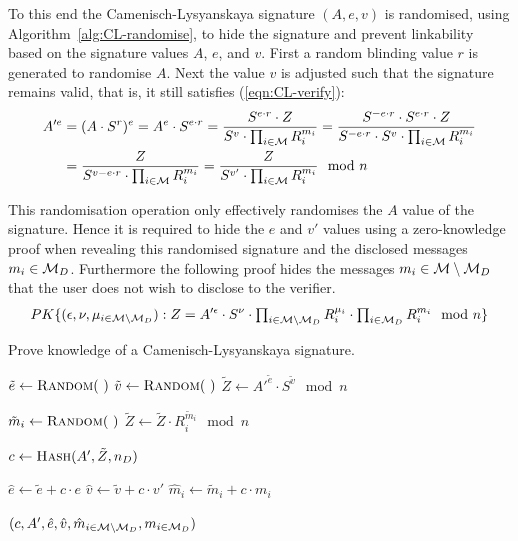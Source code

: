 To this end the Camenisch-Lysyanskaya signature $(A, e, v)$ is randomised, using
Algorithm~\ref{alg:CL-randomise}, to hide the signature and prevent linkability
based on the signature values $A$, $e$, and $v$. First a random blinding value
$r$ is generated to randomise $A$. Next the value $v$ is adjusted such that the
signature remains valid, that is, it still satisfies (\ref{eqn:CL-verify}):
\begin{align*}
  A'^e
  & = (A \cdot S^r)^e
  = A^e \cdot S^{e \cdot r}
  = \dfrac{S^{e \cdot r} \cdot Z}{S^v \cdot \prod_{i \in \mathcal{M}} R_i^{m_i}}
  = \dfrac{S^{- e \cdot r} \cdot S^{e \cdot r} \cdot Z}{S^{- e \cdot r} \cdot S^v \cdot \prod_{i \in \mathcal{M}} R_i^{m_i}} \\
  & = \dfrac{Z}{S^{v - e \cdot r} \cdot \prod_{i \in \mathcal{M}} R_i^{m_i}}
  = \dfrac{Z}{S^{v'} \cdot \prod_{i \in \mathcal{M}} R_i^{m_i}} \mod n
\end{align*}

This randomisation operation only effectively randomises the $A$ value of the
signature. Hence it is required to hide the $e$ and $v'$ values using a
zero-knowledge proof when revealing this randomised signature and the disclosed
messages $m_i \in \mathcal{M}_D$. Furthermore the following proof hides the messages
$m_i \in \mathcal{M} \setminus \mathcal{M}_D$ that the user does not wish to disclose to the
verifier.
\begin{equation*}
  PK\{(\epsilon, \nu, \mu_{i \in \mathcal{M} \setminus \mathcal{M}_D}) :
    Z = A'^{\epsilon} \cdot S^{\nu}
    \cdot \textstyle\prod_{i \in \mathcal{M} \setminus \mathcal{M}_D} R_i^{\mu_i}
    \cdot \textstyle\prod_{i \in \mathcal{M}_D} R_i^{m_i} \mod n \}
\end{equation*}

\begin{algorithm}
  \caption{Prove knowledge of a Camenisch-Lysyanskaya signature.}
  \label{alg:CL-prove-D}
  \addtolength{\baselineskip}{1mm}
  \begin{algorithmic}[1]
      \State $\tilde{e} \gets \Call{Random}{~}$
      \State $\tilde{v} \gets \Call{Random}{~}$
      \State $\tilde{Z} \gets {A'}^{\tilde{e}} \cdot S^{\tilde{v}} \mod n$

        \State $\tilde{m}_i \gets \Call{Random}{~}$
        \State $\tilde{Z} \gets \tilde{Z} \cdot R_i^{\tilde{m}_i} \mod n$
      \EndFor

      \State $c \gets \Call{Hash}{A', \tilde{Z}, n_D}$

      \State $\hat{e} \gets \tilde{e} + c \cdot e$
      \State $\hat{v} \gets \tilde{v} + c \cdot v'$
        \State $\hat{m}_i \gets \tilde{m}_i + c \cdot m_i$
      \EndFor

      \Return $(c, A', \hat{e}, \hat{v}, \hat{m}_{i \in \mathcal{M} \setminus \mathcal{M}_D}, m_{i \in \mathcal{M}_D})$
    \EndFunction
  \end{algorithmic}
\end{algorithm}

